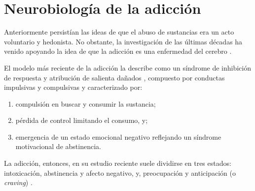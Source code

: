 \section{Neurobiología de la adicción}
Anteriormente persistían las ideas de que el abuso de sustancias era un acto voluntario y hedonista.
No obstante, la investigación de las últimas décadas ha venido apoyando la idea de que la adicción es una enfermedad del cerebro \parencite{Volkow2016}.\par
El modelo más reciente de la adicción la describe como un síndrome de inhibición de respuesta y atribución de salienta dañados \parencite{Goldstein2012a}, compuesto por conductas impulsivas y compulsivas \parencite{Koob2010a} y caracterizado por:
\begin{enumerate}
    \item{compulsión en buscar y consumir la sustancia; }
    \item{pérdida de control limitando el consumo, y; }
    \item{emergencia de un estado emocional negativo reflejando un síndrome motivacional de abstinencia.}
\end{enumerate}
La adicción, entonces, en su estudio reciente suele dividirse en tres estados: intoxicación, abstinencia y afecto negativo, y, preocupación y anticipación (o \textit{craving}) \parencite{Koob2010a,Goldstein2012a,Volkow2016}.

